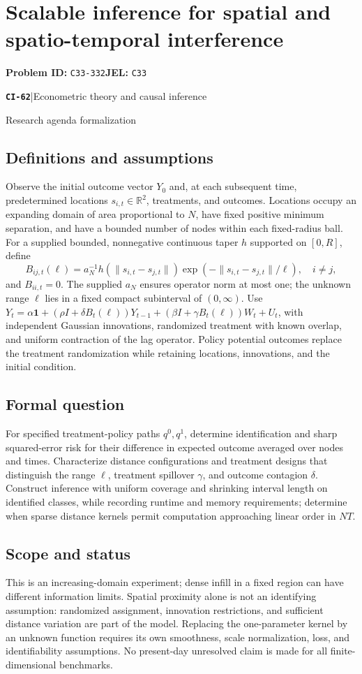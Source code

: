 \documentclass[11pt,a4paper]{article}
\newcommand{\R}{\mathbb R}
\newcommand{\entrymeta}[3]{{\sffamily\small\color{muted}\textbf{\texttt{#1}}\quad|\quad #2\par #3\par}}
\begin{document}
\section*{Scalable inference for spatial and spatio-temporal interference}
\textbf{Problem ID:} \texttt{C33-332}\quad \textbf{JEL:} \texttt{C33}\par
\label{problem:OP-0541}
\label{beyond:CI-62}
\entrymeta{CI-62}{Econometric theory and causal inference}{Research agenda formalization}
\subsection*{Definitions and assumptions}
Observe the initial outcome vector $Y_0$ and, at each subsequent time, predetermined locations $s_{i,t}\in\R^2$, treatments, and outcomes. Locations occupy an expanding domain of area proportional to $N$, have fixed positive minimum separation, and have a bounded number of nodes within each fixed-radius ball. For a supplied bounded, nonnegative continuous taper $h$ supported on $[0,R]$, define
\[
 B_{ij,t}(\ell)=a_N^{-1}h(\|s_{i,t}-s_{j,t}\|)
                  \exp(-\|s_{i,t}-s_{j,t}\|/\ell),\quad i\ne j,
\]
and $B_{ii,t}=0$. The supplied $a_N$ ensures operator norm at most one; the unknown range $\ell$ lies in a fixed compact subinterval of $(0,\infty)$. Use
$Y_t=\alpha\mathbf1+(\rho I+\delta B_t(\ell))Y_{t-1}
+(\beta I+\gamma B_t(\ell))W_t+U_t$,
with independent Gaussian innovations, randomized treatment with known overlap, and uniform contraction of the lag operator. Policy potential outcomes replace the treatment randomization while retaining locations, innovations, and the initial condition.
\subsection*{Formal question}
For specified treatment-policy paths $q^0,q^1$, determine identification and sharp squared-error risk for their difference in expected outcome averaged over nodes and times. Characterize distance configurations and treatment designs that distinguish the range $\ell$, treatment spillover $\gamma$, and outcome contagion $\delta$. Construct inference with uniform coverage and shrinking interval length on identified classes, while recording runtime and memory requirements; determine when sparse distance kernels permit computation approaching linear order in $NT$.
\subsection*{Scope and status}
This is an increasing-domain experiment; dense infill in a fixed region can have different information limits. Spatial proximity alone is not an identifying assumption: randomized assignment, innovation restrictions, and sufficient distance variation are part of the model. Replacing the one-parameter kernel by an unknown function requires its own smoothness, scale normalization, loss, and identifiability assumptions. No present-day unresolved claim is made for all finite-dimensional benchmarks.
\end{document}
